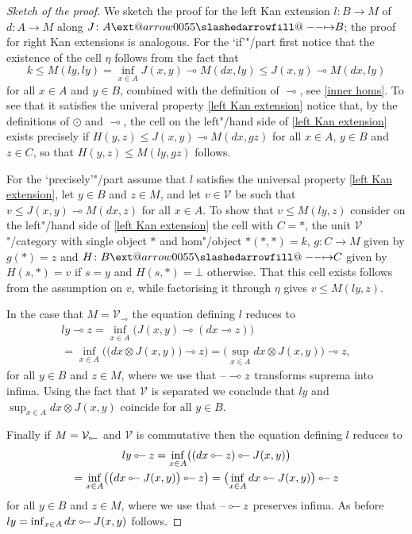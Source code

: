 \documentclass[preprint, a4paper]{elsarticle}
\makeatletter
\def\slashedarrowfill@#1#2#3#4#5{%
  $\m@th\thickmuskip0mu\medmuskip\thickmuskip\thinmuskip\thickmuskip
   \relax#5#1\mkern-7mu%
   \cleaders\hbox{$#5\mkern-2mu#2\mkern-2mu$}\hfill
   \mathclap{#3}\mathclap{#2}%
   \cleaders\hbox{$#5\mkern-2mu#2\mkern-2mu$}\hfill
   \mkern-7mu#4$%
}
\def\rightslashedarrowfill@{%
  \slashedarrowfill@\relbar\relbar\mapstochar\rightarrow}
\newcommand\xslashedrightarrow[2][]{%
  \ext@arrow 0055{\rightslashedarrowfill@}{#1}{#2}}
\def\slashedrightarrow{\xslashedrightarrow{}}
\newcommand{\dashcirc}{\multimap}
\newcommand{\circdash}{\mathbin{\text{\reflectbox{$\multimap$}}}}
\theoremstyle{definition}
\theoremstyle{remark}
\newcommand{\dash}{\textup{--}}
\providecommand{\tens}{\otimes}
\providecommand{\bigpars}[1]{\bigl(#1\bigr)}
\providecommand{\map}[3]{#1\colon#2\to#3}
\providecommand{\hmap}[3]{#1\colon#2\slashedrightarrow#3}
\providecommand{\catvar}[1]{\mathcal{#1}}
\providecommand{\2}{\mathsf 2}
\providecommand{\V}{\catvar V}
\providecommand{\hc}{\odot}
\makeatother
\begin{document}
  \begin{proof}[Sketch of the proof]
  	We sketch the proof for the left Kan extension $\map lBM$ of $\map dAM$ along $\hmap JAB$; the proof for right Kan extensions is analogous. For the `if'"/part first notice that the existence of the cell $\eta$ follows from the fact that
  	\begin{displaymath}
  		k \leq M(ly, ly) = \inf_{x \in A} J(x, y) \dashcirc M(dx, ly) \leq J(x, y) \dashcirc M(dx, ly)
  	\end{displaymath}
  	for all $x \in A$ and $y \in B$, combined with the definition of $\dashcirc$, see \eqref{inner homs}. To see that it satisfies the univeral property \eqref{left Kan extension} notice that, by the definitions of $\hc$ and $\dashcirc$, the cell on the left"/hand side of \eqref{left Kan extension} exists precisely if $H(y, z) \leq J(x,y) \dashcirc M(dx, gz)$ for all $x \in A$, $y \in B$ and $z \in C$, so that $H(y, z) \leq M(ly, gz)$ follows.
  	
  	For the `precisely'"/part assume that $l$ satisfies the universal property \eqref{left Kan extension}, let $y \in B$ and $z \in M$, and let $v \in \V$ be such that $v \leq J(x,y) \dashcirc M(dx, z)$ for all $x \in A$. To show that $v \leq M(ly, z)$ consider on the left"/hand side of \eqref{left Kan extension} the cell with $C = *$, the unit $\V$"/category with single object $*$ and hom"/object $*(*, *) = k$, $\map gCM$ given by $g(*) = z$ and $\hmap HBC$ given by $H(s,*) = v$ if $s = y$ and $H(s,*) = \bot$ otherwise. That this cell exists follows from the assumption on $v$, while factorising it through $\eta$ gives $v \leq M(ly, z)$.
  	
  	In the case that $M = \V_{\dashcirc}$ the equation defining $l$ reduces to
  	\begin{multline*}
  		ly \dashcirc z = \inf_{x \in A} \bigpars{J(x,y) \dashcirc (dx \dashcirc z)} \\ = \inf_{x \in A} \bigpars{\bigpars{dx \tens J(x,y)} \dashcirc z} = \bigpars{\sup_{x \in A} dx \tens J(x,y)} \dashcirc z,
  	\end{multline*}
  	for all $y \in B$ and $z \in M$, where we use that $\dash \dashcirc z$ transforms suprema into infima. Using the fact that $\V$ is separated we conclude that $ly$ and $\sup_{x \in A} dx \tens J(x,y)$ coincide for all $y \in B$.
  	
  	Finally if $M = \V_{\circdash}$ and $\V$ is commutative then the equation defining $l$ reduces to
  	\begin{multline*}
  		ly \circdash z = \inf_{x \in A} \bigpars{(dx \circdash z) \circdash J(x, y)} \\
  		= \inf_{x \in A} \bigpars{\bigpars{dx \circdash J(x,y)} \circdash z} = \bigpars{\inf_{x \in A} dx \circdash J(x,y)} \circdash z
  	\end{multline*}
  	for all $y \in B$ and $z \in M$, where we use that $\dash \circdash z$ preserves infima. As before $ly = \inf_{x \in A} dx \circdash J(x,y)$ follows.
  \end{proof}
  
\end{document}
